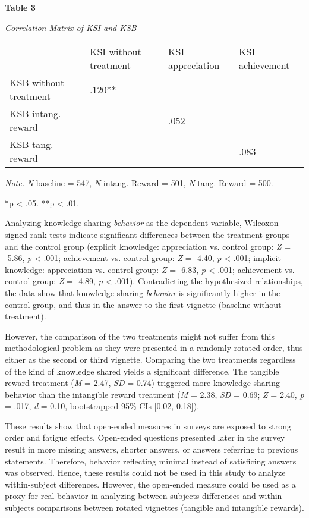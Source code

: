 \documentclass{article}
\begin{document}
\textbf{Table 3}

\emph{Correlation Matrix of KSI and KSB}


\begin{table}

  
\begin{tabular}{l  l  l  l}

   & KSI\textbf{ }without treatment & KSI appreciation & KSI achievement\\
KSB without treatment & .120** &  & \\
KSB intang. reward &  & .052  & \\
KSB tang. reward &  &  & .083 \\


\end{tabular}


\end{table}
\emph{Note.} \emph{N} baseline = 547, \emph{N} intang. Reward = 501, \emph{N} tang. Reward = 500. 

*p < .05. **p < .01.

Analyzing knowledge-sharing \emph{behavior} as the dependent variable, Wilcoxon signed-rank tests indicate significant differences between the treatment groups and the control group (explicit knowledge: appreciation vs. control group: \emph{Z} = -5.86, \emph{p} < .001; achievement vs. control group: \emph{Z} = -4.40, \emph{p} < .001; implicit knowledge: appreciation vs. control group:\emph{ Z} = -6.83, \emph{p} < .001; achievement vs. control group: \emph{Z} = -4.89, \emph{p} < .001). Contradicting the hypothesized relationships, the data show that knowledge-sharing \emph{behavior} is significantly higher in the control group, and thus in the answer to the first vignette (baseline without treatment).

However, the comparison of the two treatments might not suffer from this methodological problem as they were presented in a randomly rotated order, thus either as the second or third vignette. Comparing the two treatments regardless of the kind of knowledge shared yields a significant difference. The tangible reward treatment (\emph{M} = 2.47, \emph{SD} = 0.74) triggered more knowledge-sharing behavior than the intangible reward treatment (\emph{M} = 2.38, \emph{SD} = 0.69; \emph{Z} = 2.40, \emph{p} = .017, \emph{d} = 0.10, bootstrapped 95\% CIs [0.02, 0.18]).

These results show that open-ended measures in surveys are exposed to strong order and fatigue effects. Open-ended questions presented later in the survey result in more missing answers, shorter answers, or answers referring to previous statements. Therefore, behavior reflecting minimal instead of satisficing answers was observed. Hence, these results could not be used in this study to analyze within-subject differences. However, the open-ended measure could be used as a proxy for real behavior in analyzing between-subjects differences and within-subjects comparisons between rotated vignettes (tangible and intangible rewards).
\end{document}
